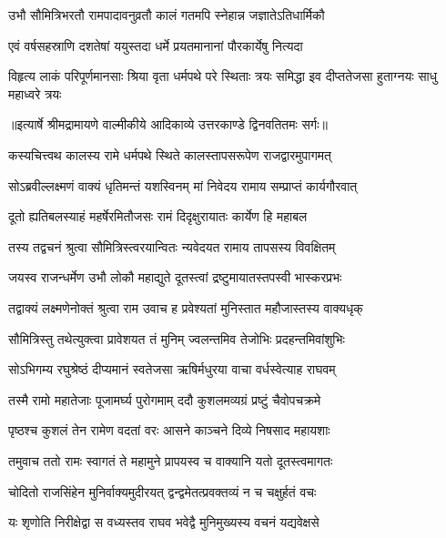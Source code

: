 \twolineshloka
{उभौ सौमित्रिभरतौ रामपादावनुव्रतौ}
{कालं गतमपि स्नेहान्न जज्ञातेऽतिधार्मिकौ} %

\twolineshloka
{एवं वर्षसहस्राणि दशतेषां ययुस्तदा}
{धर्मे प्रयतमानानां पौरकार्येषु नित्यदा} %

\fourlineindentedshloka
{विहृत्य लाकं परिपूर्णमानसाः}
{श्रिया वृता धर्मपथे परे स्थिताः}
{त्रयः समिद्धा इव दीप्ततेजसा}
{हुताग्नयः साधु महाध्वरे त्रयः} %


{॥इत्यार्षे श्रीमद्रामायणे वाल्मीकीये आदिकाव्ये उत्तरकाण्डे द्विनवतितमः सर्गः॥}


\twolineshloka
{कस्यचित्त्वथ कालस्य रामे धर्मपथे स्थिते}
{कालस्तापसरूपेण राजद्वारमुपागमत्} %

\twolineshloka
{सोऽब्रवील्लक्ष्मणं वाक्यं धृतिमन्तं यशस्विनम्}
{मां निवेदय रामाय सम्प्राप्तं कार्यगौरवात्} %

\twolineshloka
{दूतो ह्यतिबलस्याहं महर्षेरमितौजसः}
{रामं दिदृक्षुरायातः कार्येण हि महाबल} %

\twolineshloka
{तस्य तद्वचनं श्रुत्वा सौमित्रिस्त्वरयान्वितः}
{न्यवेदयत रामाय तापसस्य विवक्षितम्} %

\twolineshloka
{जयस्व राजन्धर्मेण उभौ लोकौ महाद्युते}
{दूतस्त्वां द्रष्टुमायातस्तपस्वी भास्करप्रभः} %

\twolineshloka
{तद्वाक्यं लक्ष्मणेनोक्तं श्रुत्वा राम उवाच ह}
{प्रवेश्यतां मुनिस्तात महौजास्तस्य वाक्यधृक्} %

\twolineshloka
{सौमित्रिस्तु तथेत्युक्त्वा प्रावेशयत तं मुनिम्}
{ज्वलन्तमिव तेजोभिः प्रदहन्तमिवांशुभिः} %

\twolineshloka
{सोऽभिगम्य रघुश्रेष्ठं दीप्यमानं स्वतेजसा}
{ऋषिर्मधुरया वाचा वर्धस्वेत्याह राघवम्} %

\twolineshloka
{तस्मै रामो महातेजाः पूजामर्घ्य पुरोगमाम्}
{ददौ कुशलमव्यग्रं प्रष्टुं चैवोपचक्रमे} %

\twolineshloka
{पृष्ठश्च कुशलं तेन रामेण वदतां वरः}
{आसने काञ्चने दिव्ये निषसाद महायशाः} %

\twolineshloka
{तमुवाच ततो रामः स्वागतं ते महामुने}
{प्रापयस्व च वाक्यानि यतो दूतस्त्वमागतः} %

\twolineshloka
{चोदितो राजसिंहेन मुनिर्वाक्यमुदीरयत्}
{द्वन्द्वमेतत्प्रवक्तव्यं न च चक्षुर्हतं वचः} %

\twolineshloka
{यः शृणोति निरीक्षेद्वा स वध्यस्तव राघव}
{भवेद्वै मुनिमुख्यस्य वचनं यद्यवेक्षसे} %

